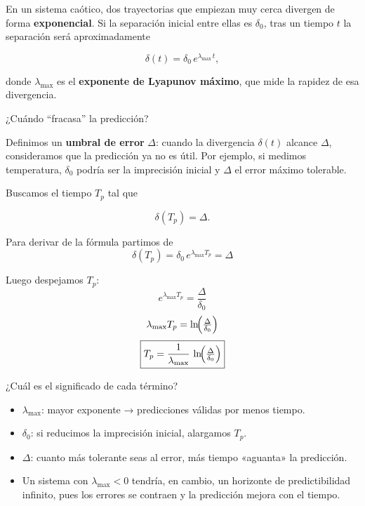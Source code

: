 \documentclass[
  10pt,
  a4paper,
  DIV=11,
  numbers=noendperiod,
  open=any]{scrreprt}
\providecommand{\tightlist}{%
  \setlength{\itemsep}{0pt}\setlength{\parskip}{0pt}}
\numberwithin{equation}{chapter}
\numberwithin{equation}{section}
\renewcommand{\[}{\begin{equation}}
\renewcommand{\]}{\end{equation}}
\begin{document}
En un sistema caótico, dos trayectorias que empiezan muy cerca divergen
de forma \textbf{exponencial}. Si la separación inicial entre ellas es
\(\delta_0\), tras un tiempo \(t\) la separación será aproximadamente

\begin{equation}
\delta(t) = \delta_0\,e^{\lambda_{\max}\,t},
\end{equation}

donde \(\lambda_{\max}\) es el \textbf{exponente de Lyapunov máximo},
que mide la rapidez de esa divergencia.

¿Cuándo ``fracasa'' la predicción?

Definimos un \textbf{umbral de error} \(\Delta\): cuando la divergencia
\(\delta(t)\) alcance \(\Delta\), consideramos que la predicción ya no
es útil. Por ejemplo, si medimos temperatura, \(\delta_0\) podría ser la
imprecisión inicial y \(\Delta\) el error máximo tolerable.

Buscamos el tiempo \(T_p\) tal que

\begin{equation}
\delta(T_p) = \Delta.
\end{equation}

Para derivar de la fórmula partimos de\\
\[
   \delta(T_p) = \delta_0\,e^{\lambda_{\max}T_p} = \Delta
   \]

Luego despejamos \(T_p\):\\
\[
   e^{\lambda_{\max}T_p} = \frac{\Delta}{\delta_0}
   \] \[
   \lambda_{\max}T_p = \ln\!\Bigl(\tfrac{\Delta}{\delta_0}\Bigr)
   \] \[
   \boxed{T_p = \frac{1}{\lambda_{\max}}\,\ln\!\Bigl(\tfrac{\Delta}{\delta_0}\Bigr)}
   \]

¿Cuál es el significado de cada término?

\begin{itemize}
\tightlist
\item
  \textbf{\(\lambda_{\max}\)}: mayor exponente → predicciones válidas
  por menos tiempo.\\
\item
  \textbf{\(\delta_0\)}: si reducimos la imprecisión inicial, alargamos
  \(T_p\).\\
\item
  \textbf{\(\Delta\)}: cuanto más tolerante seas al error, más tiempo
  «aguanta» la predicción.
\item
  Un sistema con \(\lambda_{\max}<0\) tendría, en cambio, un horizonte
  de predictibilidad infinito, pues los errores se contraen y la
  predicción mejora con el tiempo.
\end{itemize}
\end{document}
